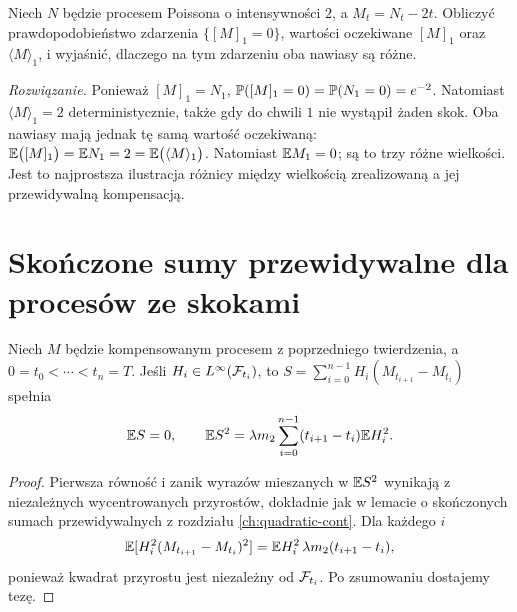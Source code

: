\begin{zadanie}
Niech $N$ będzie procesem Poissona o intensywności $2$,
a $M_t=N_t-2t$. Obliczyć prawdopodobieństwo zdarzenia
$\{[M]_1=0\}$, wartości oczekiwane $[M]_1$ oraz
$\langle M\rangle_1$, i wyjaśnić, dlaczego na tym
zdarzeniu oba nawiasy są różne.

\emph{Rozwiązanie.} Ponieważ $[M]_1=N_1$,
$\mathbb{P}([M]_1=0)=\mathbb{P}(N_1=0)=e^{-2}$.
Natomiast $\langle M\rangle_1=2$ deterministycznie,
także gdy do chwili $1$ nie wystąpił żaden skok.
Oba nawiasy mają jednak tę samą wartość oczekiwaną:
$\mathbb{E}\bigl([M]_1\bigr)=\mathbb{E} N_1=2
=\mathbb{E}\bigl(\langle M\rangle_1\bigr)$.
Natomiast $\mathbb{E} M_1=0$; są to trzy różne wielkości.
Jest to najprostsza ilustracja różnicy między wielkością
zrealizowaną a jej przewidywalną kompensacją.
\end{zadanie}


\section{Skończone sumy przewidywalne dla procesów ze skokami}
\begin{twierdzenie}
Niech $M$ będzie kompensowanym procesem z poprzedniego
twierdzenia, a $0=t_0<\cdots<t_n=T$.
Jeśli $H_i\in L^\infty(\mathcal{F}_{t_i})$, to
$S=\sum_{i=0}^{n-1}H_i(M_{t_{i+1}}-M_{t_i})$
spełnia
\[
\mathbb{E} S=0,\qquad
\mathbb{E} S^2=\lambda m_2\sum_{i=0}^{n-1}
(t_{i+1}-t_i)\mathbb{E} H_i^2.
\]
\end{twierdzenie}
\begin{proof}
Pierwsza równość i zanik wyrazów mieszanych w
$\mathbb{E} S^2$ wynikają z niezależnych wycentrowanych
przyrostów, dokładnie jak w lemacie o skończonych
sumach przewidywalnych z rozdziału
\ref{ch:quadratic-cont}. Dla każdego $i$
\[
\mathbb{E}[H_i^2(M_{t_{i+1}}-M_{t_i})^2]
=\mathbb{E} H_i^2\,\lambda m_2(t_{i+1}-t_i),
\]
ponieważ kwadrat przyrostu jest niezależny od
$\mathcal{F}_{t_i}$. Po zsumowaniu dostajemy tezę.
\end{proof}

